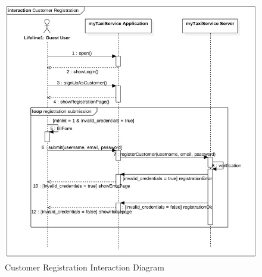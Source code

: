 				\begin{figure}[H]
					\centering
					\includegraphics[width=\textwidth, scale=0.5]{IMG/InteractionDiagrams/CustomerRegistration_Normal.png}
					\caption{Customer Registration Interaction Diagram}\label{sec:FigureCustomerRegistration_Normal}
				\end{figure}